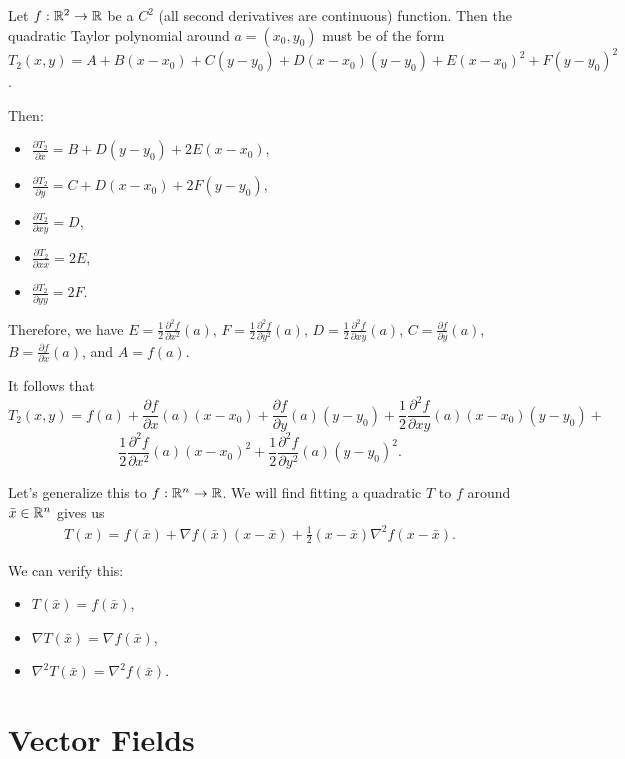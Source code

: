Let $f: \mathbb{R}^2 \to \mathbb{R}$ be a $C^2$ (all second derivatives are continuous) function. Then the quadratic Taylor polynomial around $a = (x_0, y_0)$ must be of the form $T_2(x, y) = A + B(x-x_0) + C(y-y_0) + D(x-x_0)(y-y_0) + E(x-x_0)^2 + F(y-y_0)^2$.

Then:
\begin{itemize}
    \item $\frac{\partial T_2}{\partial x} = B + D(y-y_0) + 2E(x-x_0)$,
    \item $\frac{\partial T_2}{\partial y} = C + D(x-x_0) + 2F(y-y_0)$,
    \item $\frac{\partial T_2}{\partial xy} = D$,
    \item $\frac{\partial T_2}{\partial xx} = 2E$,
    \item $\frac{\partial T_2}{\partial yy} = 2F$.
\end{itemize}

Therefore, we have $E = \frac{1}{2}\frac{\partial^2 f}{\partial x^2}(a)$, $F = \frac{1}{2}\frac{\partial^2 f}{\partial y^2}(a)$, $D = \frac{1}{2}\frac{\partial^2 f}{\partial xy}(a)$, $C = \frac{\partial f}{\partial y}(a)$, $B = \frac{\partial f}{\partial x}(a)$, and $A = f(a)$.

It follows that \[T_2(x, y) = f(a) + \frac{\partial f}{\partial x}(a)(x-x_0) + \frac{\partial f}{\partial y}(a)(y-y_0) + \frac{1}{2}\frac{\partial^2 f}{\partial xy}(a)(x-x_0)(y-y_0) + \]
\[\frac{1}{2}\frac{\partial^2 f}{\partial x^2}(a)(x-x_0)^2 + \frac{1}{2}\frac{\partial^2 f}{\partial y^2}(a)(y-y_0)^2.\]

Let's generalize this to $f: \mathbb{R}^n \to \mathbb{R}$. We will find fitting a quadratic $T$ to $f$ around $\bar{x} \in \mathbb{R}^n$ gives us
\begin{align*}
    T(x) = f(\bar{x}) + \nabla f(\bar{x})\left(x-\bar{x}\right) + \frac{1}{2}\left(x-\bar{x}\right)\nabla^2f\left(x - \bar{x}\right).
\end{align*}

We can verify this:
\begin{itemize}
    \item $T(\bar{x}) = f(\bar{x})$,
    \item $\nabla T(\bar{x}) = \nabla f(\bar{x})$,
    \item $\nabla^2 T(\bar{x}) = \nabla^2 f(\bar{x})$.
\end{itemize}

\section{Vector Fields}

